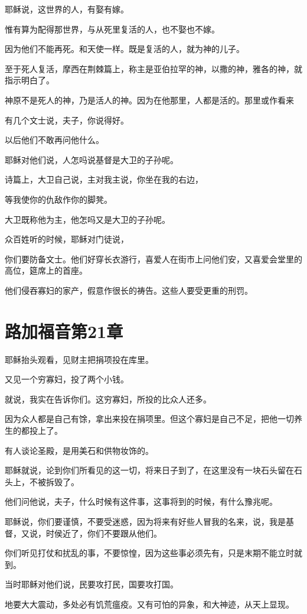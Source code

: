 \documentclass[12pt,oneside]{book}
\begin{document}
耶稣说，这世界的人，有娶有嫁。

惟有算为配得那世界，与从死里复活的人，也不娶也不嫁。

因为他们不能再死。和天使一样。既是复活的人，就为神的儿子。

至于死人复活，摩西在荆棘篇上，称主是亚伯拉罕的神，以撒的神，雅各的神，就指示明白了。

神原不是死人的神，乃是活人的神。因为在他那里，人都是活的。那里或作看来

有几个文士说，夫子，你说得好。

以后他们不敢再问他什么。

耶稣对他们说，人怎吗说基督是大卫的子孙呢。

诗篇上，大卫自己说，主对我主说，你坐在我的右边，

等我使你的仇敌作你的脚凳。

大卫既称他为主，他怎吗又是大卫的子孙呢。

众百姓听的时候，耶稣对门徒说，

你们要防备文士。他们好穿长衣游行，喜爱人在街市上问他们安，又喜爱会堂里的高位，筵席上的首座。

他们侵吞寡妇的家产，假意作很长的祷告。这些人要受更重的刑罚。

\chapter{路加福音第21章}
耶稣抬头观看，见财主把捐项投在库里。

又见一个穷寡妇，投了两个小钱。

就说，我实在告诉你们。这穷寡妇，所投的比众人还多。

因为众人都是自己有馀，拿出来投在捐项里。但这个寡妇是自己不足，把他一切养生的都投上了。

有人谈论圣殿，是用美石和供物妆饰的。

耶稣就说，论到你们所看见的这一切，将来日子到了，在这里没有一块石头留在石头上，不被拆毁了。

他们问他说，夫子，什么时候有这件事，这事将到的时候，有什么豫兆呢。

耶稣说，你们要谨慎，不要受迷惑，因为将来有好些人冒我的名来，说，我是基督，又说，时侯近了，你们不要跟从他们。

你们听见打仗和扰乱的事，不要惊惶，因为这些事必须先有，只是末期不能立时就到。

当时耶稣对他们说，民要攻打民，国要攻打国。

地要大大震动，多处必有饥荒瘟疫。又有可怕的异象，和大神迹，从天上显现。
\end{document}
